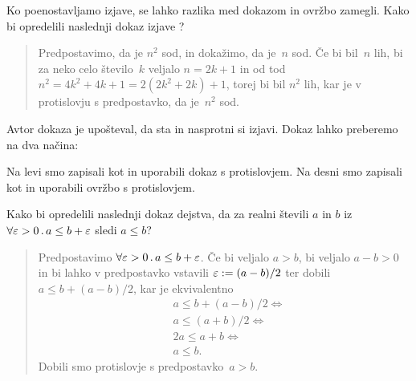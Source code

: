 \begin{zgled}
  Ko poenostavljamo izjave, se lahko razlika med dokazom in ovržbo zamegli. Kako bi opredelili naslednji dokaz izjave ?
  \begin{quote}
    Predpostavimo, da je $n^2$ sod, in dokažimo, da je~$n$ sod.
    Če bi bil~$n$ lih, bi za neko celo število~$k$ veljalo $n = 2 k + 1$ in od tod $n^2 = 4 k^2 + 4 k + 1 = 2 (2 k^2 + 2 k) + 1$, torej bi bil $n^2$ lih, kar je v protislovju s predpostavko, da je~$n^2$ sod.
  \end{quote}
  Avtor dokaza je upošteval, da sta  in  nasprotni si izjavi. Dokaz lahko preberemo na dva načina:
  \begin{boxDisplay}
    \begin{boxedProof}
      \begin{boxFrame}
      \end{boxFrame}
    \end{boxedProof}
    \boxProofSep
    \begin{boxedProof}
      \begin{boxFrame}
      \end{boxFrame}
    \end{boxedProof}
  \end{boxDisplay}
  Na levi smo  zapisali kot  in uporabili dokaz s protislovjem.
  Na desni smo  zapisali kot  in uporabili ovržbo s protislovjem.
\end{zgled}


\begin{vaja}
  Kako bi opredelili naslednji dokaz dejstva, da za realni števili $a$ in $b$ iz $\forall \varepsilon > 0 \,.\, a \leq b + \varepsilon$ sledi $a \leq b$?
  \begin{quote}
    Predpostavimo $\forall \varepsilon > 0 \,.\, a \leq b + \varepsilon$.
    Če bi veljalo $a > b$, bi veljalo $a - b > 0$ in bi lahko v predpostavko vstavili $\varepsilon \mathrel{{:}{=}} (a - b)/2$ ter dobili $a \leq b + (a - b)/2$, kar je ekvivalentno
    \begin{align*}
      &a \leq b + (a - b)/2 \iff \\
      &a \leq (a + b)/2 \iff \\
      &2 a \leq a + b \iff \\
      &a \leq b.
    \end{align*}
    Dobili smo protislovje s predpostavko~$a > b$.
  \end{quote}
\end{vaja}


